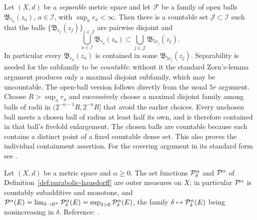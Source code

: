 \documentclass[11pt,reqno]{amsart}
\begin{document}
\begin{externalinput}\label{ext:vitali}
Let $(X,d)$ be a \emph{separable} metric space and let $\mathcal{F}$ be a family
of open balls $\mathfrak{B}_{r_{a}}(z_{a})$, $a\in\mathcal{I}$, with
$\sup_{a}r_{a}<\infty$. Then there is a countable set
$\mathcal{J}\subset\mathcal{I}$ such that the balls
$\{\mathfrak{B}_{r_{j}}(z_{j})\}_{j\in\mathcal{J}}$ are pairwise disjoint and
\[
  \bigcup_{a\in\mathcal{I}}\mathfrak{B}_{r_{a}}(z_{a})
  \subset\bigcup_{j\in\mathcal{J}}\mathfrak{B}_{5r_{j}}(z_{j}) .
\]
In particular every $\mathfrak{B}_{r_{a}}(z_{a})$ is contained in some
$\mathfrak{B}_{5r_{j}}(z_{j})$. Separability is needed for the subfamily to be
\emph{countable}: without it the standard Zorn's-lemma argument produces only a
maximal disjoint subfamily, which may be uncountable.
The open-ball version follows directly from the usual $5r$ argument. Choose
$R>\sup_a r_a$ and successively choose a maximal disjoint family among
balls of radii in $(2^{-n-1}R,2^{-n}R]$ that avoid the earlier choices.
Every unchosen ball meets a chosen ball of radius at least half its own,
and is therefore contained in that ball's fivefold enlargement. The chosen
balls are countable because each contains a distinct point of a fixed
countable dense set. This also proves the individual containment assertion.
For the covering argument in its standard form see \cite[Thm.~2.1]{Mattila1995}.
\end{externalinput}

\begin{externalinput}\label{ext:hausdorff}
Let $(X,d)$ be a metric space and $\alpha\ge0$. The set functions
$\mathcal{P}^{\alpha}_{\delta}$ and $\mathcal{P}^{\alpha}$ of
Definition~\ref{def:parabolic-hausdorff} are outer measures on $X$; in
particular $\mathcal{P}^{\alpha}$ is countably subadditive and monotone, and
$\mathcal{P}^{\alpha}(E)=\lim_{\delta\to0^{+}}\mathcal{P}^{\alpha}_{\delta}(E)
 =\sup_{\delta>0}\mathcal{P}^{\alpha}_{\delta}(E)$, the family
$\delta\mapsto\mathcal{P}^{\alpha}_{\delta}(E)$ being nonincreasing in $\delta$.
Reference: \cite[Ch.~4]{Mattila1995}.
\end{externalinput}
\end{document}
